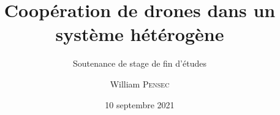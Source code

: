 \title[Soutenance de fin d'études]{Coopération de drones dans un système hétérogène}
\subtitle{Soutenance de stage de fin d'études}
\author{William \textsc{Pensec}}
\date{10 septembre 2021}

